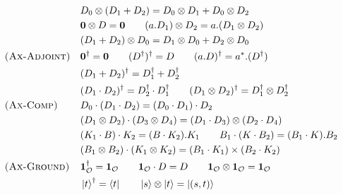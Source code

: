 {\begin{align*}
        \\ & &&
        D_0 \otimes (D_1 + D_2) = D_0 \otimes D_1 + D_0 \otimes D_2
        \\ & &&
        \mathbf{0} \otimes D = \mathbf{0} 
        \qquad
        (a.D_1) \otimes D_2 = a.(D_1 \otimes D_2)
        \\ & &&
        (D_1 + D_2) \otimes D_0 = D_1 \otimes D_0 + D_2 \otimes D_0
        \\ 
            & \textsc{(Ax-Adjoint)} &&
        \mathbf{0}^\dagger = \mathbf{0}
        \qquad
        (D^\dagger)^\dagger = D 
        \qquad
        (a.D)^\dagger = a^*.(D^\dagger)
        \\ & &&
        (D_1 + D_2)^\dagger = D_1^\dagger + D_2^\dagger
        \\
        & && (D_1 \cdot D_2)^\dagger = D_2^\dagger \cdot D_1^\dagger
        \qquad
        (D_1 \otimes D_2)^\dagger = D_1^\dagger \otimes D_2^\dagger
        \\
            & \textsc{(Ax-Comp)} &&
        D_0 \cdot (D_1 \cdot D_2) = (D_0 \cdot D_1) \cdot D_2
        \\ & &&
        (D_1 \otimes D_2) \cdot (D_3 \otimes D_4) = (D_1 \cdot D_3) \otimes (D_2 \cdot D_4)
        \\ & &&
        (K_1 \cdot B) \cdot K_2 = (B \cdot K_2).K_1
        \qquad
        B_1 \cdot (K \cdot B_2) = (B_1 \cdot K).B_2
        \\ 
            & &&
        (B_1 \otimes B_2) \cdot (K_1 \otimes K_2) = (B_1 \cdot K_1) \times (B_2 \cdot K_2)
        \\ 
            & \textsc{(Ax-Ground)} &&
        \mathbf{1}_\mathcal{O}^\dagger = \mathbf{1}_\mathcal{O}
        \qquad
        \textbf{1}_\mathcal{O} \cdot D = D 
        \qquad
        \mathbf{1}_\mathcal{O} \otimes \mathbf{1}_\mathcal{O} = \mathbf{1}_\mathcal{O} 
        \\ & &&
        \ket{t}^\dagger = \bra{t}
        \qquad
        \ket{s} \otimes \ket{t} =\ket{(s, t)} 
        \\

\end{align*}}
